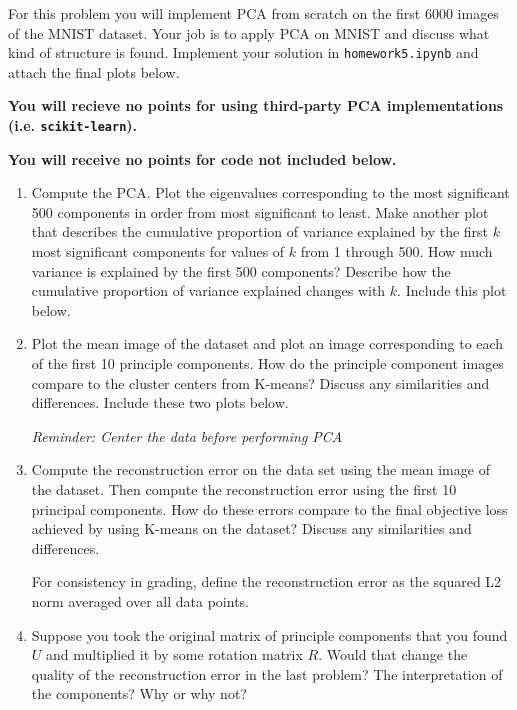 \documentclass[submit]{harvardml}
\begin{document}
\begin{problem}

  
For this problem you will implement PCA from scratch on the first 6000 images of the MNIST dataset. Your job is to apply PCA on MNIST and discuss what kind of structure is found. Implement your solution in \texttt{homework5.ipynb} and attach the final plots below.

{\bfseries You will recieve no points for using third-party PCA implementations (i.e. {\normalfont \texttt{scikit-learn}}).}

{\bfseries You will receive no points for code not included below.}
\begin{enumerate}

\item Compute the PCA. Plot the eigenvalues corresponding to the most
  significant 500 components in order from most significant to
  least. Make another plot that describes the cumulative proportion of
  variance explained by the first $k$ most significant components for
  values of $k$ from 1 through 500.  How much variance is explained by
  the first 500 components?  Describe how the cumulative proportion of
  variance explained changes with $k$.  Include this plot below.

\item Plot the mean image of the dataset and plot an image
  corresponding to each of the first 10 principle components.  How do
  the principle component images compare to the cluster centers from
  K-means? Discuss any similarities and differences.  Include these
  two plots below.
  
  \textit{Reminder: Center the data before performing PCA}

\item Compute the reconstruction error on the data set using the mean
  image of the dataset.  Then compute the reconstruction error using
  the first 10 principal components.  How do these errors compare to
  the final objective loss achieved by using K-means on the dataset?
  Discuss any similarities and differences.

  For consistency in grading, define the reconstruction error as the squared L2
  norm averaged over all data points.


\item Suppose you took the original matrix of principle components
  that you found $U$ and multiplied it by some rotation matrix $R$.
  Would that change the quality of the reconstruction error in the
  last problem?  The interpretation of the components?  Why or why
  not?


\end{enumerate}
\end{problem}
\end{document}
